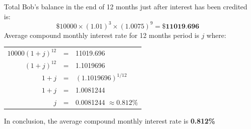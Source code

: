 \documentclass{article}
\begin{document}
\begin{enumerate}
		Total Bob's balance in the end of 12 months just after interest has been credited is:
		$$\$10000\times(1.01)^3\times(1.0075)^9=\textbf{\$11019.696}$$
		Average compound monthly interest rate for 12 months period is $j$ where: 
		\begin{center}
			\begin{tabular}{rcl}
				$10000(1+j)^{12}$&=&11019.696\\
				$(1+j)^{12}$&=&1.1019696\\
				$1+j$&=&$(1.1019696)^{1/12}$\\
				$1+j$&=&1.0081244\\
				$j$&=&0.0081244 $\approx0.812\%$\\
			\end{tabular}
		\end{center}
		
		In conclusion, the average compound monthly interest rate is \textbf{0.812\%}
		

\end{enumerate}
\end{document}
